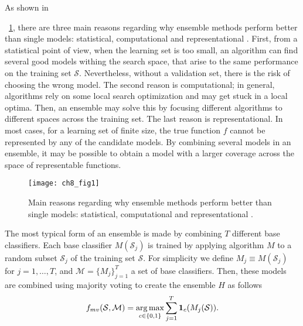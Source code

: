 As shown in \figurename{~\ref{fig:8:1}, there are three main reasons regarding why ensemble 
methods perform better than single models: statistical, computational and representational 
\citep{Dietterich2000a}. First, from a statistical point of view, when the learning set is too 
small, an algorithm can find several good models withing the search space, that arise to the same 
performance on the training set $\mathcal{S}$. Nevertheless, without a validation set, there is 
the risk of choosing the wrong model. The second reason is computational; in general, algorithms 
rely on some local search optimization and may get stuck in a local optima. Then, an ensemble may 
solve this by focusing different algorithms to different spaces across the training set. The last 
reason is representational. In most cases, for a learning set of finite size, the  true function 
$f$ cannot be represented by any of the candidate models. By combining several  models in an 
ensemble, it may be possible to obtain a model with a larger coverage across the  space of 
representable functions.
  
\begin{figure}[t!]
\texttt{[image: ch8\_fig1]}
\caption{Main reasons regarding why ensemble methods perform better than 
  single models: statistical, computational and representational \citep{Dietterich2000a}.}
\label{fig:8:1}
\end{figure} 
  
  The most typical form of an ensemble is made by combining $T$ different base classifiers.
  Each  base classifier $M(\mathcal{S}_j)$ is trained by applying algorithm $M$ to a random subset 
  $\mathcal{S}_j$ of the training set $\mathcal{S}$.  %
  For simplicity we define $M_j \equiv  M(\mathcal{S}_j)$ for $j=1,\dots,T$, and 
  $\mathcal{M}=\{M_j\}_{j=1}^{T}$ a set of base classifiers.
  Then, these models are combined using majority voting to create the ensemble $H$ as follows
  \begin{align}\label{eqn:majority-vote}
    f_{mv}(\mathcal{S},\mathcal{M}) = \operatorname*{arg\,max}_{c \in \{0,1\}} \sum_{j=1}^T 
    \mathbf{1}_c(M_j(\mathcal{S})).
  \end{align}

}
